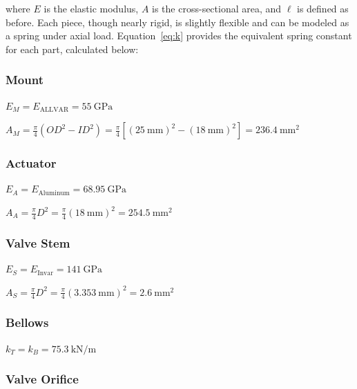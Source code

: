 \documentclass[12pt, letterpaper]{report}%
\newcounter{mycounter}           %
\newcounter{sub}[mycounter]      %
\newcommand{\specEAl}{\SI{68.95}{\giga \pascal}}
\newcommand{\specEALLV}{\SI{55}{\giga \pascal}}
\newcommand{\specEInv}{\SI{141}{\giga \pascal}}
\newcommand{\specBellowsK}{\SI{75.3}{\kilo \newton \per \meter}} %
\begin{document}
\begin{appendices}
			where $E$ is the elastic modulus, $A$ is the cross-sectional area, and $\ell$ is defined as before.
			Each piece, though nearly rigid, is slightly flexible and can be modeled as a spring under axial load.
			Equation~\eqref{eq:k} provides the equivalent spring constant for each part, calculated below:
			
			\subsubsection{Mount}
			\label{app:sat:TF:force_balance:M}

				$E_M = E_{\text{ALLVAR}} = \specEALLV$\cite{ref_AllvarAlloys}
				
				$A_M = \frac{\pi}{4} (OD^2 - ID^2) = \frac{\pi}{4} [(\SI{25}{\milli\meter})^2 - (\SI{18}{\milli\meter})^2] = \SI{236.4}{\milli\meter\squared}$

			\subsubsection{Actuator}
			\label{app:sat:TF:force_balance:A}

				$E_A = E_{\text{Aluminum}} = \specEAl$\cite[p.~39]{ref_NASA_specs_Al}

				$A_A = \frac{\pi}{4} D^2 = \frac{\pi}{4} (\SI{18}{\milli\meter})^2 = \SI{254.5}{\milli\meter\squared}$

			\subsubsection{Valve Stem}
			\label{app:sat:TF:force_balance:S}

				$E_S = E_{\text{Invar}} = \specEInv $\cite{ref_Carpenter_Inv}

				$A_S = \frac{\pi}{4} D^2 = \frac{\pi}{4} (\SI{3.353}{\milli\meter})^2 = \SI{2.6}{\milli\meter\squared}$
				
			\subsubsection{Bellows}
			\label{app:sat:TF:force_balance:TB}

				$k_T = k_B = \specBellowsK $\cite{ref_miniflex_design}

			\subsubsection{Valve Orifice}    
			\label{app:sat:TF:force_balance:V}
			

\end{appendices}
\end{document}
